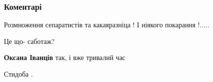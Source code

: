  
 
 
 
 
\subsubsection{Коментарі}

\begin{itemize}
 
Розмноження сепаратистів та какаяразніца !
І ніякого покарання !.....

 
Це що- саботаж?

\begin{itemize}
 
\textbf{Оксана Іванців} так, і вже тривалий час
\end{itemize}

 
Стидоба .

 

\end{itemize}
